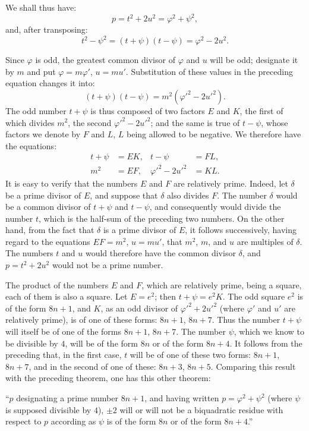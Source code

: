 \par\indent
We shall thus have:
\[
p=t^2+2u^2=\varphi^2+\psi^2,
\]
and, after transposing:
\[
t^2-\psi^2=(t+\psi)(t-\psi)=\varphi^2-2u^2.
\]
\par\indent
Since $\varphi$ is odd, the greatest common divisor of $\varphi$ and $u$ will be odd;
designate it by $m$ and put $\varphi=m\varphi'$, $u=mu'$. Substitution of these
values in the preceding equation changes it into:
\[
(t+\psi)(t-\psi)=m^2(\varphi'^2-2u'^2).
\]
The odd number $t+\psi$ is thus composed of two factors $E$ and $K$, the first
of which divides $m^2$, the second $\varphi'^2-2u'^2$; and the same is true of
$t-\psi$, whose factors we denote by $F$ and $L$, $L$ being allowed to be negative.
We therefore have the equations:
\[
\begin{aligned}
t+\psi&=EK, &t-\psi&=FL,\\
m^2&=EF, &\varphi'^2-2u'^2&=KL.
\end{aligned}
\]
It is easy to verify that the numbers $E$ and $F$ are relatively prime. Indeed,
let $\delta$ be a prime divisor of $E$, and suppose that $\delta$ also divides $F$.
The number $\delta$ would be a common divisor of $t+\psi$ and $t-\psi$, and consequently
would divide the number $t$, which is the half-sum of the preceding two numbers.
On the other hand, from the fact that $\delta$ is a prime divisor of $E$, it follows
successively, having regard to the equations $EF=m^2$, $u=mu'$, that $m^2$, $m$,
and $u$ are multiples of $\delta$. The numbers $t$ and $u$ would therefore have the
common divisor $\delta$, and $p=t^2+2u^2$ would not be a prime number.
\par\indent
The product of the numbers $E$ and $F$, which are relatively prime, being a
square, each of them is also a square. Let $E=e^2$; then $t+\psi=e^2K$. The odd
square $e^2$ is of the form $8n+1$, and $K$, as an odd divisor of
$\varphi'^2+2u'^2$ (where $\varphi'$ and $u'$ are relatively prime), is of one of
these forms: $8n+1$, $8n+7$. Thus the number $t+\psi$ will itself be of one of
the forms $8n+1$, $8n+7$. The number $\psi$, which we know to be divisible by $4$,
will be of the form $8n$ or of the form $8n+4$. It follows from the preceding
that, in the first case, $t$ will be of one of these two forms: $8n+1$, $8n+7$,
and in the second of one of these: $8n+3$, $8n+5$. Comparing this result with
the preceding theorem, one has this other theorem:
\par\indent
“$p$ designating a prime number $8n+1$, and having written $p=\varphi^2+\psi^2$
(where $\psi$ is supposed divisible by $4$), $\pm2$ will or will not be a biquadratic
residue with respect to $p$ according as $\psi$ is of the form $8n$ or of the form $8n+4$.”
